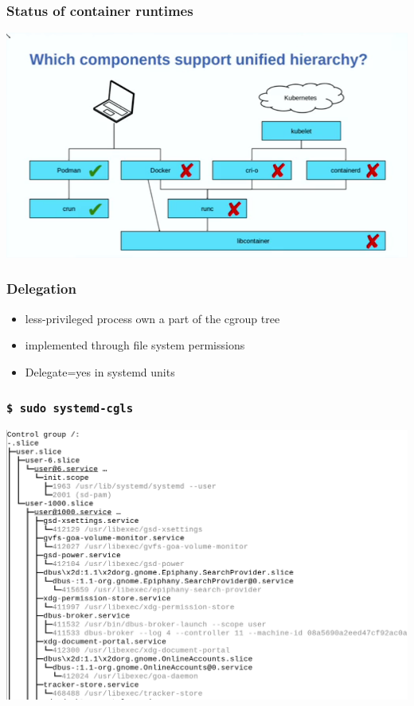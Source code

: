 \documentclass[serif]{beamer}
\begin{document}
\begin{frame}
  \frametitle{Status of container runtimes}

  \includegraphics[width=\textwidth]{container-runtime-status.png}
\end{frame}

\begin{frame}
  \frametitle{Delegation}
  
  \begin{itemize}
  \item less-privileged process own a part of the cgroup tree
  \item implemented through file system permissions
  \item Delegate=yes in systemd units
  \end{itemize}
\end{frame}

\begin{frame}[fragile]
  \tiny
  \frametitle{\texttt{\$ sudo systemd-cgls}}
  \includegraphics[width=\textwidth]{delegation-cgls.png}
\end{frame}
\end{document}

